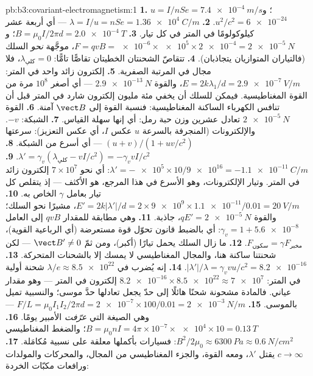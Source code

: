 \begin{solution}{pb:b3:covariant-electromagnetism:1}
\textbf{1.} $u = I/nSe = \qty{7.4e-4}{m/s}$؛ و $u^2/c^2 =
\num{6e-24}$.
\textbf{2.} $\lambda = I/u = nSe = \qty{1.36e4}{C/m}$ --- أي أربعة
عشر كيلوكولومًا في المتر في كل تيار.
\textbf{3.} $B = \mu_0I/2\pi d = \qty{2.0e-4}{T}$؛ و $F = qvB =
\num{e-6} \times \num{e5} \times \num{2e-4} = \qty{2e-5}{N}$،
موجَّهة \emph{نحو} السلك (فالتياران المتوازيان يتجاذبان).
\textbf{4.} تتقاصّ الشحنتان الخطيتان تقاصًّا تامًّا: $\lambda_{\text{كلي}}
= 0$، فلا مجال في المرتبة الصفرية.
\textbf{5.} إلكترون زائد واحد في المتر: $E = 2k\lambda_1/d =
\qty{2.9e-7}{V/m}$، والقوة $\qty{2.9e-13}{N}$ --- أي أصغر $10^8$ مرة
من القوة المغناطيسية. فيمكن للسلك أن يخفي مئة مليون
إلكترون شارد في المتر قبل أن تنافس الكهرباء الساكنة المغناطيسية:
فنسبة القوة إلى $\vect B$ آمنة.
\textbf{6.} القوة $\qty{2e-5}{N}$ تعادل عشرين وزن حبة رمل: أي إنها سهلة
القياس.
\textbf{7.} الشبكة: $-v$. والإلكترونات (المنجرفة بالسرعة $u$ عكس $I$،
أي عكس التعزيز): سرعتها $(u + v)/(1 + uv/c^2)$ --- أي أسرع
من الشبكة.
\textbf{8.} $\lambda' = \gamma_v(\lambda_{\text{كلي}} - vI/c^2) =
-\gamma_v vI/c^2$.
\textbf{9.} $\lambda' = -\num{e5} \times 10/\num{9e16} =
\qty{-1.1e-11}{C/m}$: أي نحو $7 \times 10^7$ إلكترون زائد في
المتر. وتيار الإلكترونات، وهو الأسرع في هذا المرجع، هو الأكثف
--- إذ يتقلص كل تيار بعامل $\gamma$ الخاص به.
\textbf{10.} $E' = 2k|\lambda'|/d = 2 \times \num{9e9} \times
\num{1.1e-11}/0.01 = \qty{20}{V/m}$، مشيرًا نحو السلك؛ والقوة
$qE' = \qty{2e-5}{N}$، جاذبة.
\textbf{11.} وهي مطابقة للمقدار $qvB$ إلى العامل $\gamma_v = 1 +
\num{5.6e-8}$: أي بالضبط قانون تحوّل قوة مستعرضة
(أي الرباعية القوية)، $F_{\text{سكون}} = \gamma F_{\text{مخبر}}$.
\textbf{12.} ما زال السلك يحمل تيارًا (أكبر)، ومن ثمّ $\vect
B' \neq 0$ --- لكن شحنتنا ساكنة هنا، والمجال المغناطيسي
لا يمسك إلا بالشحنات المتحركة.
\textbf{13.} $|\lambda'|/\lambda = \gamma_v vu/c^2 = \num{8.2e-16}$.
\textbf{14.} إنه يُضرب في $\lambda/e \approx \num{8.5e22}$
شحنة أولية في المتر: $\num{8.2e-16} \times \num{8.5e22}
\approx \num{7e7}$ إلكترون في المتر --- وهو مقدار عياني. فالمادة
مشحونة شحنًا هائلًا إلى حدّ يجعل تعادلها حدَّ موسى؛ والنسبية
تميل بالموسى.
\textbf{15.} $F/L = \mu_0I_1I_2/2\pi d = \num{2e-7} \times 100/0.01 =
\qty{2e-3}{N/m}$ --- وهي الصيغة التي \emph{عرّفت} الأمبير يومًا.
\textbf{16.} $B = \mu_0nI = 4\pi\times10^{-7} \times \num{e4} \times
10 = \qty{0.13}{T}$؛ والضغط المغناطيسي $B^2/2\mu_0 \approx
\qty{6300}{Pa} \approx \qty{0.6}{N/cm^2}$: فسيارات بأكملها معلقة
على نسبية مُكامَلة.
\textbf{17.} $c \to \infty$ يقتل $\lambda'$، ومعه القوة،
والجزء المغناطيسي من المجال، والمحركات والمولدات ورافعات مكبّات الخردة:

\end{solution}
